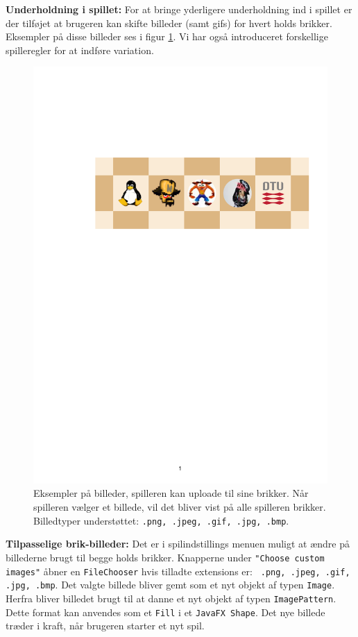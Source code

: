 \textbf{Underholdning i spillet:} 
For at bringe yderligere underholdning ind i spillet er der tilføjet at brugeren kan skifte billeder (samt gifs) for hvert holds brikker. Eksempler på disse billeder ses i figur \ref{fig:ShowcasePieces}. Vi har også introduceret forskellige spilleregler for at indføre variation.
\\
\begin{figure}[H]
    \centering
    \includegraphics[width = 0.9 \textwidth]{Figurer/ShowcasePieces.pdf}
    \caption{Eksempler på billeder, spilleren kan uploade til sine brikker. Når spilleren vælger et billede, vil det bliver vist på alle spilleren brikker. Billedtyper understøttet: \texttt{.png, .jpeg, .gif, .jpg,  .bmp}.}
    \label{fig:ShowcasePieces}
    \end{figure}

\textbf{Tilpasselige brik-billeder:} Det er i spilindstillings menuen muligt at ændre på billederne brugt til begge holds brikker. Knapperne under \texttt{"Choose custom images"} åbner en \texttt{FileChooser} hvis tilladte extensions er: \texttt{ .png, .jpeg, .gif, .jpg,  .bmp}. Det valgte billede bliver gemt som et nyt objekt af typen \texttt{Image}. Herfra bliver billedet brugt til at danne et nyt objekt af typen \texttt{ImagePattern}. Dette format kan anvendes som et \texttt{Fill} i et \texttt{JavaFX Shape}. Det nye billede træder i kraft, når brugeren starter et nyt spil.\\

